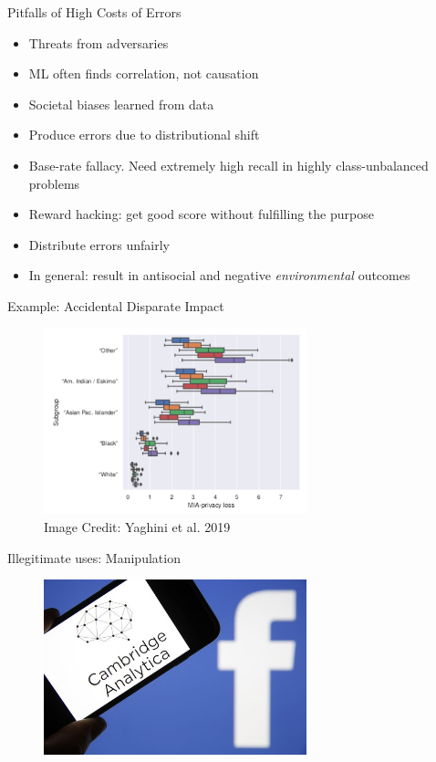 \documentclass[10pt]{beamer}
\begin{document}
\begin{frame}{Pitfalls of High Costs of Errors}
  \begin{itemize}[<+-| alert@+>]
    \item Threats from adversaries
    \item ML often finds correlation, not causation
    \item Societal biases learned from data
    \item Produce errors due to distributional shift
    \item Base-rate fallacy. Need extremely high recall in highly class-unbalanced problems
    \item Reward hacking: get good score without fulfilling the purpose
    \item Distribute errors unfairly
    \item In general: result in antisocial and negative \emph{environmental} outcomes
  \end{itemize}
\end{frame}

\begin{frame}{Example: Accidental Disparate Impact}
  \begin{figure}
    \includegraphics[width=3in]{losses.png} \\
    Image Credit: Yaghini et al. 2019
  \end{figure}
\end{frame}

\begin{frame}{Illegitimate uses: Manipulation}
  \begin{figure}
    \centering
    \includegraphics[width=3in]{cambridge_analytica.jpg} \\
  \end{figure}
\end{frame}
\end{document}
